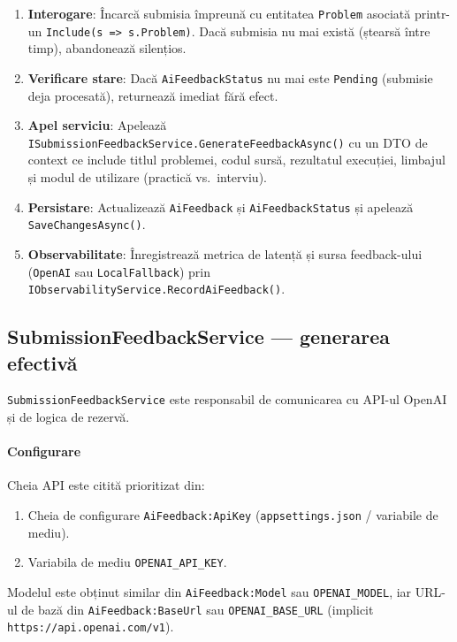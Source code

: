 \begin{enumerate}
  \item \textbf{Interogare}: Încarcă submisia împreună cu entitatea
        \texttt{Problem} asociată printr-un \texttt{Include(s => s.Problem)}.
        Dacă submisia nu mai există (ștearsă între timp), abandonează
        silențios.

  \item \textbf{Verificare stare}: Dacă \texttt{AiFeedbackStatus} nu mai
        este \texttt{Pending} (submisie deja procesată), returnează imediat
        fără efect.

  \item \textbf{Apel serviciu}: Apelează
        \texttt{ISubmissionFeedbackService.GenerateFeedbackAsync()} cu un
        DTO de context ce include titlul problemei, codul sursă, rezultatul
        execuției, limbajul și modul de utilizare (practică vs.\ interviu).

  \item \textbf{Persistare}: Actualizează \texttt{AiFeedback} și
        \texttt{AiFeedbackStatus} și apelează \texttt{SaveChangesAsync()}.

  \item \textbf{Observabilitate}: Înregistrează metrica de latență și
        sursa feedback-ului (\texttt{OpenAI} sau \texttt{LocalFallback})
        prin \texttt{IObservabilityService.RecordAiFeedback()}.
\end{enumerate}

\subsection{SubmissionFeedbackService — generarea efectivă}

\texttt{SubmissionFeedbackService} este responsabil de comunicarea cu
API-ul OpenAI și de logica de rezervă.

\paragraph{Configurare}
Cheia API este citită prioritizat din:
\begin{enumerate}
  \item Cheia de configurare \texttt{AiFeedback:ApiKey}
        (\texttt{appsettings.json} / variabile de mediu).
  \item Variabila de mediu \texttt{OPENAI\_API\_KEY}.
\end{enumerate}
Modelul este obținut similar din \texttt{AiFeedback:Model} sau
\texttt{OPENAI\_MODEL}, iar URL-ul de bază din \texttt{AiFeedback:BaseUrl}
sau \texttt{OPENAI\_BASE\_URL} (implicit
\texttt{https://api.openai.com/v1}).

